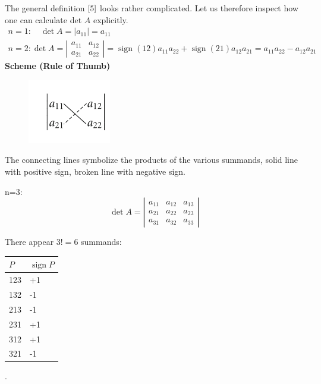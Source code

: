 \documentclass[12pt]{book}
\theoremstyle{definition}\newtheorem{dfn}{Définition}[chapter]
\theoremstyle{plain}\newtheorem{thm}{Théorème}[chapter]
\theoremstyle{plain}\newtheorem{prp}{Proposition}[chapter]
\theoremstyle{plain}\newtheorem{lem}{\bf Lemme}[chapter]
\theoremstyle{plain}\newtheorem{axm}{\bf Axiome}[chapter]
\theoremstyle{plain}\newtheorem{lmm}{\bf Lemme}[chapter]
\theoremstyle{plain}\newtheorem{cor}{\bf Corollaire}[chapter]
\theoremstyle{remark}\newtheorem{rem}{Remarque}[chapter]
\begin{document}
The general definition $\ref{5}$ looks rather complicated. Let us therefore inspect how one can calculate det $A$ explicitly.
\begin{equation}
\begin{array}{c}
n=1: \quad \operatorname{det} A=\left|a_{11}\right|=a_{11} \\
n=2:\operatorname{det} A=\left|\begin{array}{cc}
a_{11} & a_{12} \\
a_{21} & a_{22}
\end{array}\right|=\operatorname{sign}(12) a_{11} a_{22}+\operatorname{sign}(21) a_{12} a_{21}
=a_{11} a_{22}-a_{12} a_{21}
\end{array}\label{6}
\end{equation}
{\bf Scheme (Rule of Thumb)}
\begin{figure}[H]
	\centering
	\includegraphics[scale=1]{image//Mathematiques preparations//Determinant//1}
\end{figure}
The connecting lines symbolize the products of the various summands, solid line with positive sign, broken line with negative sign.


n=3:
$$
\operatorname{det} A=\left|\begin{array}{lll}
a_{11} & a_{12} & a_{13} \\
a_{21} & a_{22} & a_{23} \\
a_{31} & a_{32} & a_{33}
\end{array}\right|
$$

There appear $3 !=6$ summands:
\begin{tabular}{ll}
	$P$ & $\operatorname{sign} P$ \\
	\hline 123 & +1 \\
	132 & -1 \\
	213 & -1 \\
	231 & +1 \\
	312 & +1 \\
	321 & -1
\end{tabular}.
\end{document}
